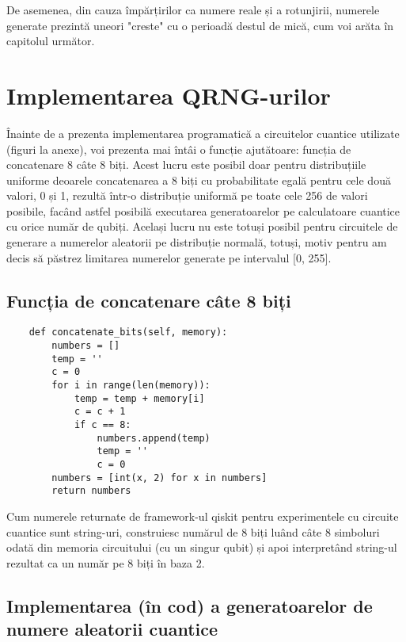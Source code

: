 De asemenea, din cauza împărțirilor ca numere reale și a rotunjirii, numerele generate prezintă uneori "creste" cu o perioadă destul de mică, cum voi arăta în capitolul următor.

\section{Implementarea QRNG-urilor}

Înainte de a prezenta implementarea programatică a circuitelor cuantice utilizate (figuri la anexe), voi prezenta mai întâi o funcție ajutătoare: funcția de concatenare 8 câte 8 biți. Acest lucru este posibil doar pentru distribuțiile uniforme deoarele concatenarea a 8 biți cu probabilitate egală pentru cele două valori, 0 și 1, rezultă într-o distribuție uniformă pe toate cele 256 de valori posibile, facând astfel posibilă executarea generatoarelor pe calculatoare cuantice cu orice număr de qubiți. Același lucru nu este totuși posibil pentru circuitele de generare a numerelor aleatorii pe distribuție normală, totuși, motiv pentru am decis să păstrez limitarea numerelor generate pe intervalul [0, 255]. 

\subsection{Funcția de concatenare câte 8 biți}

\begin{code}
\begin{verbatim}
    def concatenate_bits(self, memory):
        numbers = []
        temp = ''
        c = 0
        for i in range(len(memory)):
            temp = temp + memory[i]
            c = c + 1
            if c == 8:
                numbers.append(temp)
                temp = ''
                c = 0
        numbers = [int(x, 2) for x in numbers]
        return numbers
\end{verbatim}
\end{code}

Cum numerele returnate de framework-ul qiskit pentru experimentele cu circuite cuantice sunt string-uri, construiesc numărul de 8 biți luând câte 8 simboluri odată din memoria circuitului (cu un singur qubit) și apoi interpretând string-ul rezultat ca un număr pe 8 biți în baza 2.

\subsection{Implementarea (în cod) a generatoarelor de numere aleatorii cuantice}

